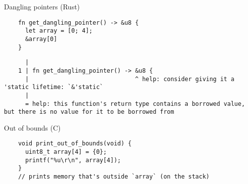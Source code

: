 \begin{frame}[fragile]{Dangling pointers (Rust)}

  \begin{verbatim}
    fn get_dangling_pointer() -> &u8 {
      let array = [0; 4];
      &array[0]
    }
  \end{verbatim}

  \begin{verbatim}
      |
    1 | fn get_dangling_pointer() -> &u8 {
      |                              ^ help: consider giving it a 'static lifetime: `&'static`
      |
      = help: this function's return type contains a borrowed value, but there is no value for it to be borrowed from
  \end{verbatim}


\end{frame}

\begin{frame}[fragile]{Out of bounds (C)}
  \begin{verbatim}
    void print_out_of_bounds(void) {
      uint8_t array[4] = {0};
      printf("%u\r\n", array[4]);
    }
    // prints memory that's outside `array` (on the stack)
  \end{verbatim}

\end{frame}

